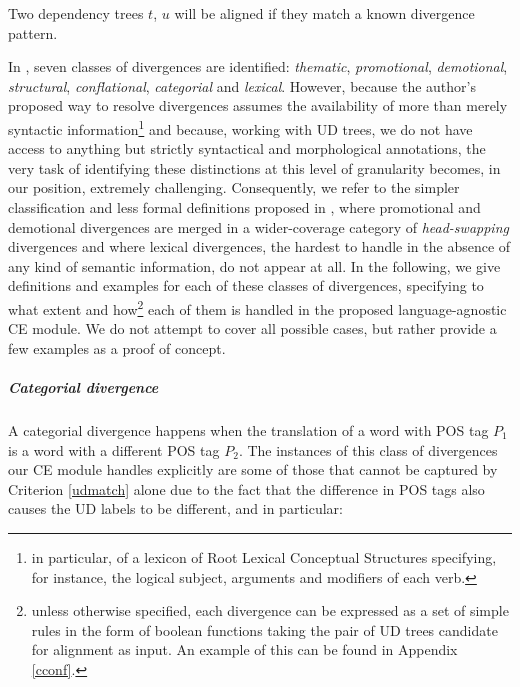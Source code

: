 \begin{criterion}
 Two dependency trees $t$, $u$ will be aligned if they match a known divergence pattern. 
\end{criterion} \smallskip

In \cite{divs}, seven classes of divergences are identified: \textit{thematic}, \textit{promotional}, \textit{demotional}, \textit{structural}, \textit{conflational}, \textit{categorial} and \textit{lexical}. 
However, because the author's proposed way to resolve divergences assumes the availability of more than merely syntactic information\footnote{in particular, of a lexicon of Root Lexical Conceptual Structures specifying, for instance, the logical subject, arguments and modifiers of each verb.} and because, working with UD trees, we do not have access to anything but strictly syntactical and morphological annotations, the very task of identifying these distinctions at this level of granularity becomes, in our position, extremely challenging. 
Consequently, we refer to the simpler classification and less formal definitions proposed in \cite{divs2}, where promotional and demotional divergences are merged in a wider-coverage category of \textit{head-swapping} divergences and where lexical divergences, the hardest to handle in the absence of any kind of semantic information, do not appear at all.
In the following, we give definitions and examples for each of these classes of divergences, specifying to what extent and how\footnote{unless otherwise specified, each divergence can be expressed as a set of simple rules in the form of boolean functions taking the pair of UD trees candidate for alignment as input. An example of this can be found in Appendix \ref{cconf}.} each of them is handled in the proposed language-agnostic CE module. We do not attempt to cover all possible cases, but rather provide a few examples as a proof of concept.

\subparagraph*{Categorial divergence}
A categorial divergence happens when the translation of a word with POS tag $P_1$ is a word with a different POS tag $P_2$. 
The instances of this class of divergences our CE module handles explicitly are some of those that cannot be captured by Criterion \ref{udmatch} alone due to the fact that the difference in POS tags also causes the UD labels to be different, and in particular:

